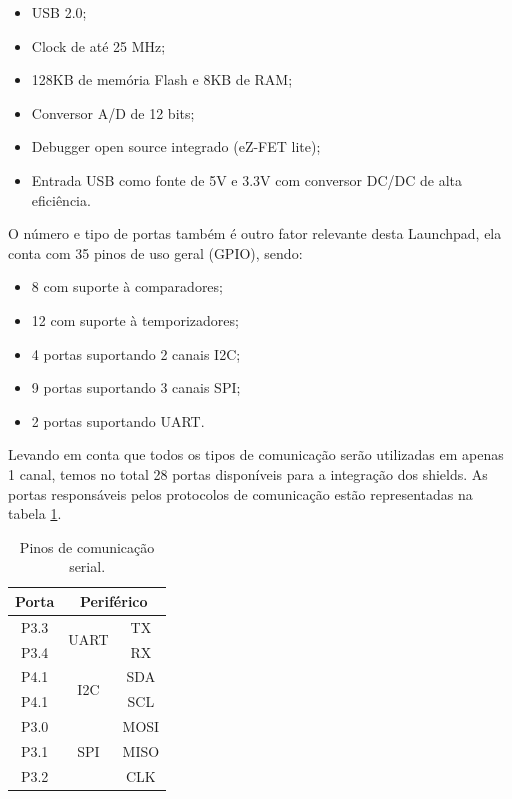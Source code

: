 \begin{itemize}
	\item USB 2.0;
	\item Clock de até 25 MHz;
	\item 128KB de memória Flash e 8KB de RAM;
	\item Conversor A/D de 12 bits;
	\item Debugger open source integrado (eZ-FET lite);
	\item Entrada USB como fonte de 5V e 3.3V com conversor DC/DC de alta eficiência.
\end{itemize}

O número e tipo de portas também é outro fator relevante desta Launchpad, ela conta com 35 pinos de uso geral (GPIO), sendo:

\begin{itemize}
	\item 8 com suporte à comparadores;
	\item 12 com suporte à temporizadores;
	\item 4 portas suportando 2 canais I2C;
	\item 9 portas suportando 3 canais SPI;
	\item 2 portas suportando UART.
\end{itemize}

Levando em conta que todos os tipos de comunicação serão utilizadas em apenas 1 canal, temos no total 28 portas disponíveis para a integração dos shields. As portas responsáveis pelos protocolos de comunicação estão representadas na tabela \ref{tab:serial}.

\begin{table}[h!]
\centering
\begin{tabular}{|c|c|c|}
\hline
Porta & \multicolumn{2}{c|}{Periférico} \\ \hline
P3.3  & \multirow{2}{*}{UART}   & TX    \\ \cline{1-1} \cline{3-3} 
P3.4  &                         & RX    \\ \hline
P4.1  & \multirow{2}{*}{I2C}    & SDA   \\ \cline{1-1} \cline{3-3} 
P4.1  &                         & SCL   \\ \hline
P3.0  & \multirow{3}{*}{SPI}    & MOSI  \\ \cline{1-1} \cline{3-3} 
P3.1  &                         & MISO  \\ \cline{1-1} \cline{3-3} 
P3.2  &                         & CLK   \\ \hline
\end{tabular}
\caption{Pinos de comunicação serial.}
\label{tab:serial}
\end{table}


